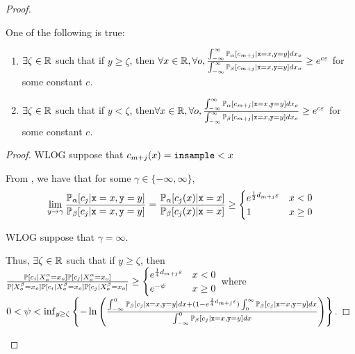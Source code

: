 \begin{proof}
\begin{lemma}\label{bigenoughlemmacase1leakingcycle}
	One of the following is true: \begin{enumerate}
		\item $\exists \zeta\in \RR$ such that if $y\geq\zeta$, then $\forall x\in \RR, \forall o, \frac{\int_{-\infty}^\infty\PP_\alpha[c_{m+j}|\texttt{x}=x, \texttt{y}=y]dx_o}{\int_{-\infty}^\infty \PP_\beta[c_{m+j}|\texttt{x}=x, \texttt{y}=y]dx_o}\geq e^{c\varepsilon}$ for some constant $c$.
		\item  $\exists \zeta\in \RR$ such that if $y<\zeta$, then$\forall x\in \RR, \forall o, \frac{\int_{-\infty}^\infty\PP_\alpha[c_{m+j}|\texttt{x}=x, \texttt{y}=y]dx_o}{\int_{-\infty}^\infty \PP_\beta[c_{m+j}|\texttt{x}=x, \texttt{y}=y]dx_o}\geq e^{c\varepsilon}$ for some constant $c$.
	\end{enumerate}
	
\end{lemma}
\begin{proof}
	WLOG suppose that $c_{m+j}(x) = \lguard[x]$

	From \cite{chadhaLinearTimeDecidability2021}, we have that for some $\gamma\in \{-\infty, \infty\}$, \[\lim_{y\to\gamma}\frac{\PP_\alpha[c_j|\texttt{x}=x, \texttt{y}=y]}{\PP_\beta[c_j|\texttt{x}=x, \texttt{y}=y]} = \frac{\PP_\alpha[c_j(x)|\texttt{x}=x]}{\PP_\beta[c_j(x)|\texttt{x}=x]}\geq \begin{cases}
		e^{\frac{1}{2}d_{m+j}\varepsilon} & x<0\\
		1 & x\geq 0
	\end{cases}\]

	WLOG suppose that $\gamma =\infty$. 

	Thus, $\exists \zeta\in \RR$ such that if $y\geq \zeta$, then $\frac{\PP[c_i|X_o^\alpha = x_o]\PP[c_j|X_o^\alpha = x_o]}{\PP[X_o^\beta=x_o] \PP[c_i|X_o^\beta = x_o]\PP[c_j|X_o^\beta = x_o]} \geq \begin{cases}
		e^{\frac{1}{4}d_{m+j}\varepsilon} & x<0\\
		e^{-\psi} & x\geq 0
	\end{cases}$ where $0<\psi < \inf_{y\geq \zeta}\left\{-\ln\left(\frac{\int_{-\infty}^{0}\PP_\beta[c_j|\texttt{x}=x, \texttt{y}=y]dx+(1-e^{\frac{1}{4}d_{m+j}\varepsilon})\int_{0}^{\infty}\PP_\beta[c_j|\texttt{x}=x, \texttt{y}=y]dx}{\int_{-\infty}^{0}\PP_\beta[c_j|\texttt{x}=x, \texttt{y}=y]dx}\right)\right\}$.


\end{proof}
\end{proof}
